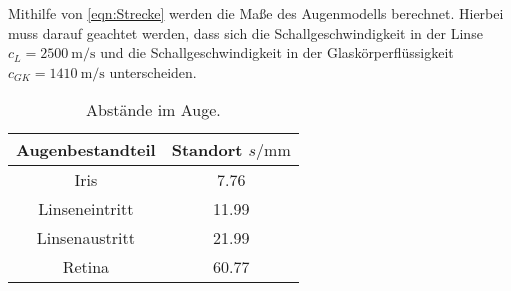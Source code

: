Mithilfe von \autoref{eqn:Strecke} werden die Maße des Augenmodells berechnet. Hierbei muss darauf geachtet werden, dass sich
die Schallgeschwindigkeit in der Linse $c_L= \qty{2500}{\meter\per\second}$ und die Schallgeschwindigkeit in der Glaskörperflüssigkeit
$c_{GK}= \qty{1410}{\meter\per\second}$ unterscheiden.

\begin{table}[H]
  \centering
  \caption{Abstände im Auge.}
  \label{tab:Auge}
  \begin{tabular}{c S[table-format=2.2] }
  \toprule
  {Augenbestandteil} & {Standort $s / \si{\milli\meter}$} \\
  \midrule
  Iris            &  7.76\\
  Linseneintritt  &  11.99\\
  Linsenaustritt  &  21.99\\
  Retina          &  60.77\\
  \bottomrule
  \end{tabular}
\end{table}

